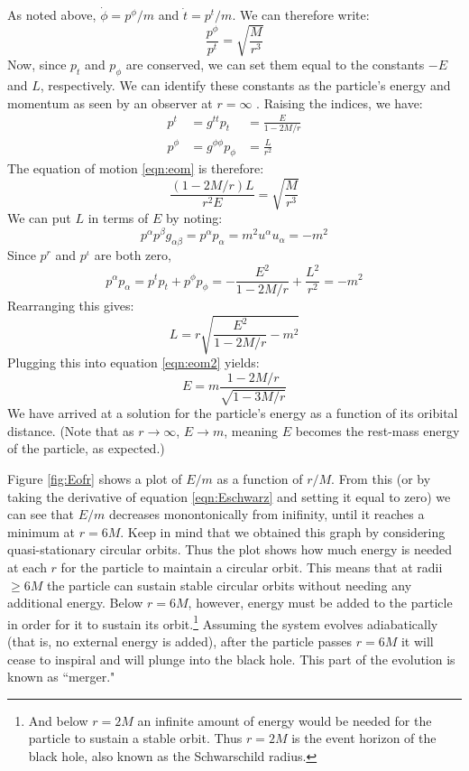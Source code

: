 As noted above, $\dot{\phi} = p^\phi/m$ and $\dot{t} = p^t/m$. We can therefore write:
\begin{equation}
\label{eqn:eom1}
\frac{p^\phi}{p^t} = \sqrt{\frac{M}{r^3}}
\end{equation}
Now, since $p_t$ and $p_\phi$ are conserved, we can set them equal to the constants $-E$ and $L$, respectively. We can identify these constants as the particle's energy and momentum as seen by an observer at $r = \infty$ \cite{ref:Schutz}. Raising the indices, we have:
\begin{align}
p^t &= g^{tt}p_t &= \frac{E}{1-2M/r} \\
p^\phi &= g^{\phi\phi}p_\phi &= \frac{L}{r^2}
\end{align}
The equation of motion \ref{eqn:eom} is therefore:
\begin{equation}
\label{eqn:eom2}
\frac{(1-2M/r)L}{r^2E} = \sqrt{\frac{M}{r^3}}
\end{equation}
We can put $L$ in terms of $E$ by noting:
\begin{equation*}
p^{\alpha}p^{\beta}g_{\alpha\beta} = p^{\alpha}p_{\alpha} = m^2 u^{\alpha}u_{\alpha} = -m^2
\end{equation*}
Since $p^r$ and $p^\iota$ are both zero,
\begin{equation*}
p^{\alpha}p_{\alpha} = p^t p_t + p^\phi p_\phi = -\frac{E^2}{1-2M/r} + \frac{L^2}{r^2} = -m^2
\end{equation*}
Rearranging this gives:
\begin{equation}
L = r\sqrt{\frac{E^2}{1-2M/r} - m^2}
\end{equation}
Plugging this into equation \ref{eqn:eom2} yields:
\begin{equation}
\label{eqn:Eschwarz}
E = m\frac{1-2M/r}{\sqrt{1-3M/r}}
\end{equation}
We have arrived at a solution for the particle's energy as a function of its oribital distance. (Note that as $r\rightarrow \infty$, $E \rightarrow m$, meaning $E$ becomes the rest-mass energy of the particle, as expected.) 

Figure \ref{fig:Eofr} shows a plot of $E/m$ as a function of $r/M$. From this (or by taking the derivative of equation \ref{eqn:Eschwarz} and setting it equal to zero) we can see that $E/m$ decreases monontonically from inifinity, until it reaches a minimum at $r=6M$. Keep in mind that we obtained this graph by considering quasi-stationary circular orbits. Thus the plot shows how much energy is needed at each $r$ for the particle to maintain a circular orbit. This means that at radii $\geq 6M$ the particle can sustain stable circular orbits without needing any additional energy. Below $r=6M$, however, energy must be added to the particle in order for it to sustain its orbit.\footnote{And below $r=2M$ an infinite amount of energy would be needed for the particle to sustain a stable orbit. Thus $r=2M$ is the event horizon of the black hole, also known as the Schwarschild radius.} Assuming the system evolves adiabatically (that is, no external energy is added), after the particle passes $r=6M$ it will cease to inspiral and will plunge into the black hole. This part of the evolution is known as ``merger."

